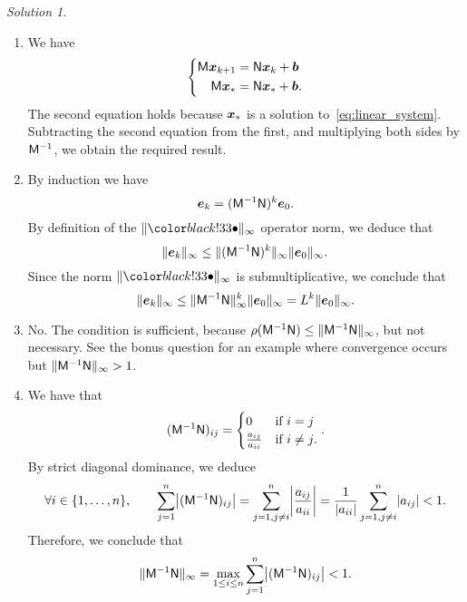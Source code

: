 \documentclass[11pt]{article}
\theoremstyle{definition}
\theoremstyle{remark}
\newtheorem*{solution}{Solution}
\begin{document}
\begin{solution}
    \begin{enumerate}
        \item
            We have
            \[
                \left\{
                    \begin{aligned}
                        \mathsf M \mathbf{\boldsymbol{x}}_{k+1} &= \mathsf N \mathbf{\boldsymbol{x}}_{k} + \mathbf{\boldsymbol{b}} \\
                        \mathsf M \mathbf{\boldsymbol{x}}_{*} &= \mathsf N \mathbf{\boldsymbol{x}}_{*} + \mathbf{\boldsymbol{b}}.
                    \end{aligned}
                \right.
            \]
            The second equation holds because $\mathbf{\boldsymbol{x}}_*$ is a solution to~\eqref{eq:linear_system}.
            Subtracting the second equation from the first,
            and multiplying both sides by $\mathsf M^{-1}$,
            we obtain the required result.

        \item
            By induction we have
            \[
                \mathbf{\boldsymbol{e}}_k = (\mathsf M^{-1} \mathsf N)^k \mathbf{\boldsymbol{e}}_0.
            \]
            By definition of the $\norm{\placeholder}_{\infty}$ operator norm,
            we deduce that
            \[
                \lVert\mathbf{\boldsymbol{e}}_k\rVert_{\infty} \leq \lVert(\mathsf M^{-1} \mathsf N)^k\rVert_{\infty} \lVert\mathbf{\boldsymbol{e}}_0\rVert_{\infty}.
            \]
            Since the norm $\norm{\placeholder}_{\infty}$ is submultiplicative,
            we conclude that
            \[
                \lVert\mathbf{\boldsymbol{e}}_k\rVert_{\infty} \leq \lVert\mathsf M^{-1} \mathsf N\rVert_{\infty}^k \lVert\mathbf{\boldsymbol{e}}_0\rVert_{\infty}
                = L^k \lVert\mathbf{\boldsymbol{e}}_0\rVert_{\infty}.
            \]

        \item
            No. The condition is sufficient, because $\rho(\mathsf M^{-1} \mathsf N) \leq \lVert\mathsf M^{-1} \mathsf N\rVert_{\infty}$,
            but not necessary.
            See the bonus question for an example where convergence occurs but $\lVert\mathsf M^{-1} \mathsf N\rVert_{\infty} > 1$.

        \item
            We have that
            \[
                (\mathsf M^{-1} \mathsf N)_{ij} =
                \begin{cases}
                    0 & \text{if $i = j$} \\
                    \frac{a_{ij}}{a_{ii}} & \text{if $i \neq j$}.
                \end{cases}.
            \]
            By strict diagonal dominance, we deduce
            \[
                \forall  i \in \{1, \dotsc, n\},
                \qquad
                \sum_{j=1}^{n} \abs*{(\mat M^{-1} \mat N)_{ij}}
                = \sum_{j=1, j\neq i}^{n} \abs*{\frac{a_{ij}}{a_{ii}}}
                = \frac{1}{\abs{a_{ii}}}\sum_{j=1, j\neq i}^{n} \abs*{a_{ij}} < 1.
            \]
            Therefore, we conclude that
            \[
                \norm{\mat M^{-1} \mat N}_{\infty}
                = \max_{1 \leq i \leq n} \sum_{j=1}^{n} \abs*{(\mat M^{-1} \mat N)_{ij}}  < 1.
            \]


\end{enumerate}
\end{solution}
\end{document}
